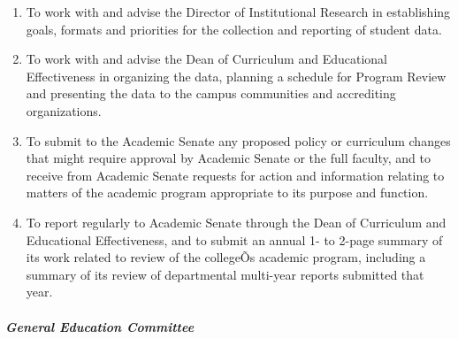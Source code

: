 \documentclass[letterpaper, 11pt]{article}
\begin{document}
\begin{enumerate}[label=\alph*)]
{\begin{enumerate}[label=\arabic*)]
{\begin{enumerate}[label=(\alph*)]
										\item{to review the results of the multi-year review and provide timely feedback for the department to consider for its meeting with the Provost and the Dean of Curriculum and Educational Effectiveness;}
										\item{to provide the department with comments or suggestions to assist them in their preparation for the next review cycle;}
										\item{to encourage a campus conversation that establishes the value of a college-wide program review and addresses concerns as appropriate.}
									\end{enumerate}
								}
								\item{To work with and advise the Director of Institutional Research in establishing goals, formats and priorities for the collection and reporting of student data.}
								\item{To work with and advise the Dean of Curriculum and Educational Effectiveness in organizing the data, planning a schedule for Program Review and presenting the data to the campus communities and accrediting organizations.}
								\item{To submit to the Academic Senate any proposed policy or curriculum changes that might require approval by Academic Senate or the full faculty, and to receive from Academic Senate requests for action and information relating to matters of the academic program appropriate to its purpose and function.}
								\item{To report regularly to Academic Senate through the Dean of Curriculum and Educational Effectiveness, and to submit an annual 1- to 2-page summary of its work related to review of the collegeÕs academic program, including a summary of its review of departmental multi-year reports submitted that year.}
							\end{enumerate}
						}
					\end{enumerate}
				\subparagraph{General Education Committee}
\end{document}
